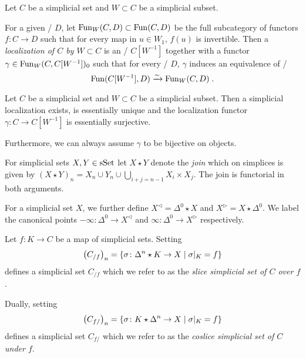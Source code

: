 \begin{definition}
    Let $C$ be a simplicial set and $W\subset C$ be a simplicial subset.

    For a given \inftycat/ $D$, let $\operatorname{Fun}_W(C,D)\subset\operatorname{Fun}(C,D)$ be the full subcategory of functors $f\colon C\to D$ such that for every map in $u\in W_1$, $f(u)$ is invertible.
    Then a \emph{localization of $C$ by $W\subset C$} is an \inftycat/ $C[W^{-1}]$ together with a functor $\gamma\in\operatorname{Fun}_W(C, C[W^{-1}])_0$ such that for every \inftycat/ $D$, $\gamma$ induces an equivalence of \inftycats/
    \begin{equation*}
        \operatorname{Fun}(C[W^{-1}],D)\xrightarrow{\sim}\operatorname{Fun}_W(C,D)\;.
    \end{equation*}
\end{definition}
\begin{lemma}\label{prop:simpLocEssSurj}
    Let $C$ be a simplicial set and $W\subset C$ be a simplicial subset.
    Then a simplicial localization exists, is essentially unique and the localization functor $\gamma\colon C\to C[W^{-1}]$ is essentially surjective.

    Furthermore, we can always assume $\gamma$ to be bijective on objects.
    \begin{reference}
        \cite[Proposition 7.1.3 and Remark 7.1.4]{cisinski_2019}
    \end{reference}
\end{lemma}
\begin{definition}[Join]
    For simplicial sets $X,Y\in\operatorname{sSet}$ let $X\star Y$ denote the \emph{join} which on simplices is given by $(X\star Y)_n=X_n\cup Y_n\cup\bigcup\limits_{i+j=n-1}X_i\times X_j$.
    The join is functorial in both arguments.
    
    For a simplicial set $X$, we further define $X^{\lhd}=\Delta^0\star X$ and $X^{\rhd}=X\star\Delta^0$.
    We label the canonical points $-\infty\colon\Delta^0\to X^{\lhd}$ and $\infty\colon\Delta^0\to X^{\rhd}$ respectively.
\end{definition}
\begin{definition}[(Co)Slice] %
    Let $f\colon K\to C$ be a map of simplicial sets.
    Setting 
    \begin{equation*}
        \left(C_{/f}\right)_n=\left\lbrace\sigma\colon \Delta^n\star K\to X \mid \sigma|_K=f\right\rbrace
    \end{equation*}
    defines a simplicial set $C_{/f}$ which we refer to as the \emph{slice simplicial set of $C$ over $f$}.

    Dually, setting 
    \begin{equation*}
        \left(C_{f/}\right)_n=\left\lbrace\sigma\colon K\star \Delta^n \to X \mid \sigma|_K=f\right\rbrace
    \end{equation*}
    defines a simplicial set $C_{f/}$ which we refer to as the \emph{coslice simplicial set of $C$ under $f$}.
\end{definition}
